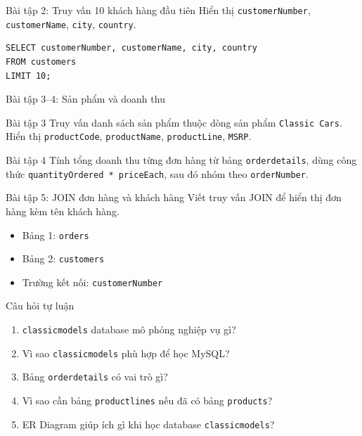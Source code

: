 \documentclass[aspectratio=169,professionalfonts]{beamer}
\newcommand{\code}[1]{\texttt{#1}}
\begin{document}
\begin{frame}[fragile]{Bài tập 2: Truy vấn 10 khách hàng đầu tiên}
Hiển thị \code{customerNumber}, \code{customerName}, \code{city}, \code{country}.
\begin{lstlisting}[style=sqlstyle]
SELECT customerNumber, customerName, city, country
FROM customers
LIMIT 10;
\end{lstlisting}
\end{frame}

\begin{frame}{Bài tập 3--4: Sản phẩm và doanh thu}
\begin{block}{Bài tập 3}
Truy vấn danh sách sản phẩm thuộc dòng sản phẩm \code{Classic Cars}. Hiển thị \code{productCode}, \code{productName}, \code{productLine}, \code{MSRP}.
\end{block}
\begin{block}{Bài tập 4}
Tính tổng doanh thu từng đơn hàng từ bảng \code{orderdetails}, dùng công thức \code{quantityOrdered * priceEach}, sau đó nhóm theo \code{orderNumber}.
\end{block}
\end{frame}

\begin{frame}{Bài tập 5: JOIN đơn hàng và khách hàng}
Viết truy vấn JOIN để hiển thị đơn hàng kèm tên khách hàng.
\vspace{0.5em}
\begin{itemize}
  \item Bảng 1: \code{orders}
  \item Bảng 2: \code{customers}
  \item Trường kết nối: \code{customerNumber}
\end{itemize}
\end{frame}

\begin{frame}{Câu hỏi tự luận}
\begin{enumerate}
  \item \code{classicmodels} database mô phỏng nghiệp vụ gì?
  \item Vì sao \code{classicmodels} phù hợp để học MySQL?
  \item Bảng \code{orderdetails} có vai trò gì?
  \item Vì sao cần bảng \code{productlines} nếu đã có bảng \code{products}?
  \item ER Diagram giúp ích gì khi học database \code{classicmodels}?
\end{enumerate}
\end{frame}
\end{document}
